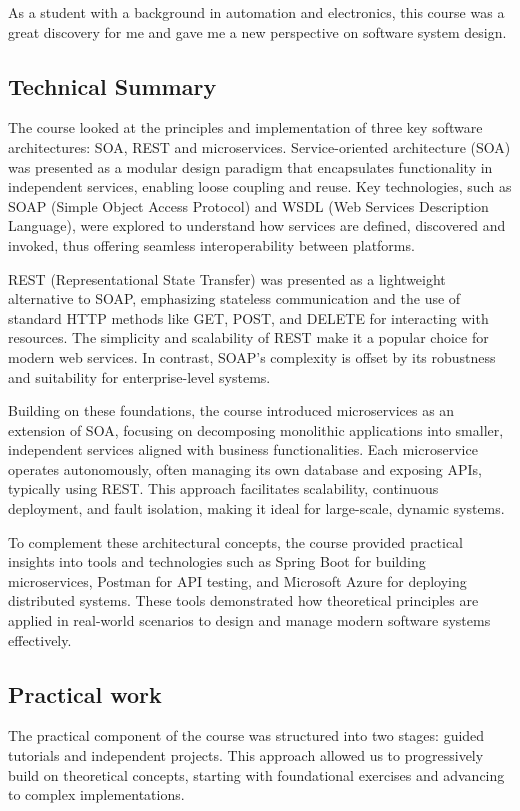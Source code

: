 As a student with a background in automation and electronics, this course was a great discovery for me and gave me a new perspective on software system design. 

\subsection{Technical Summary} 
\indent \indent The course looked at the principles and implementation of three key software architectures: SOA, REST and microservices.
Service-oriented architecture (SOA) was presented as a modular design paradigm that encapsulates functionality in independent services, enabling loose coupling and reuse.
Key technologies, such as SOAP (Simple Object Access Protocol) and WSDL (Web Services Description Language), were explored to understand how services are defined, discovered and invoked, thus offering seamless interoperability between platforms.
\vspace{0.25cm}

REST (Representational State Transfer) was presented as a lightweight alternative to SOAP, emphasizing stateless communication and the use of standard HTTP methods like GET, POST, and DELETE for interacting with resources. 
The simplicity and scalability of REST make it a popular choice for modern web services. 
In contrast, SOAP's complexity is offset by its robustness and suitability for enterprise-level systems.
\vspace{0.25cm}

Building on these foundations, the course introduced microservices as an extension of SOA, focusing on decomposing monolithic applications into smaller, independent services aligned with business functionalities. 
Each microservice operates autonomously, often managing its own database and exposing APIs, typically using REST. This approach facilitates scalability, continuous deployment, and fault isolation, making it ideal for large-scale, dynamic systems.
\vspace{0.25cm}

To complement these architectural concepts, the course provided practical insights into tools and technologies such as Spring Boot for building microservices, Postman for API testing, and Microsoft Azure for deploying distributed systems. 
These tools demonstrated how theoretical principles are applied in real-world scenarios to design and manage modern software systems effectively.

\subsection{Practical work}
The practical component of the course was structured into two stages: guided tutorials and independent projects. This approach allowed us to progressively build on theoretical concepts, starting with foundational exercises and advancing to complex implementations.

